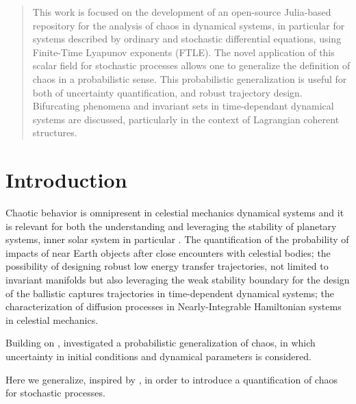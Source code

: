 \documentclass{juliacon}
\begin{document}


\maketitle

\begin{abstract}

This work is focused on the development of an open-source Julia-based repository for the analysis of chaos in dynamical systems, 
in particular for systems described by ordinary and stochastic differential equations, using Finite-Time Lyapunov exponents (FTLE).
The novel application of this scalar field for stochastic processes allows one to generalize the definition of chaos in a probabilistic sense.
This probabilistic generalization is useful for both of uncertainty quantification, and robust trajectory design.
Bifurcating phenomena and invariant sets in time-dependant dynamical systems are discussed, particularly in the context of Lagrangian coherent structures.

\end{abstract}

\section{Introduction}

Chaotic behavior is omnipresent in celestial mechanics dynamical systems and it is relevant for both the understanding and 
leveraging the stability of planetary systems, inner solar system in particular \cite{celletti}. 
The quantification of the probability of impacts of near Earth objects after close encounters with celestial bodies; 
the possibility of designing robust low energy transfer trajectories, not limited to invariant manifolds but also leveraging the 
weak stability boundary for the design of the ballistic captures trajectories in time-dependent dynamical systems; 
the characterization of diffusion processes in Nearly-Integrable Hamiltonian systems in celestial mechanics. 

Building on \cite{Szebehely82}, \cite{ManziAAS2020, VasileManzi} investigated a probabilistic generalization of chaos, in which uncertainty in initial conditions and dynamical parameters is considered.

Here we generalize, inspired by \cite{Balibrea-Iniesta}, in order to introduce a quantification of chaos for stochastic processes.
\end{document}
